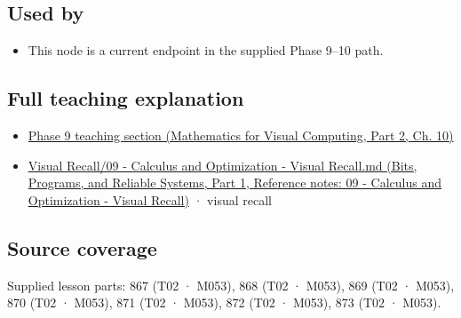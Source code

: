 \subsection{Used by}\label{appendix-54c8f5828387-used-by}

\hypertarget{appendix-54c8f5828387-used-by}{}

\begin{itemize}
\tightlist
\item
  This node is a current endpoint in the supplied Phase 9--10 path.
\end{itemize}

\subsection{Full teaching explanation}\label{appendix-54c8f5828387-full-teaching-explanation}

\hypertarget{appendix-54c8f5828387-full-teaching-explanation}{}

\begin{itemize}
\tightlist
\item
  \href{../02-Mathematics-for-Visual-Computing-P02/main.pdf\#nameddest=02-foundations-ii-ch026-optimization-and-inverse-problems}{Phase 9 teaching section (Mathematics for Visual Computing, Part 2, Ch. 10)}
\item
  \href{../01-Bits-Programs-and-Reliable-Systems-P01/main.pdf\#nameddest=appendix-adf48f5dc5c1}{Visual Recall/09 - Calculus and Optimization - Visual Recall.md (Bits, Programs, and Reliable Systems, Part 1, Reference notes: 09 - Calculus and Optimization - Visual Recall)} · visual recall
\end{itemize}

\subsection{Source coverage}\label{appendix-54c8f5828387-source-coverage}

\hypertarget{appendix-54c8f5828387-source-coverage}{}

Supplied lesson parts: 867 (T02 · M053), 868 (T02 · M053), 869 (T02 · M053), 870 (T02 · M053), 871 (T02 · M053), 872 (T02 · M053), 873 (T02 · M053).
